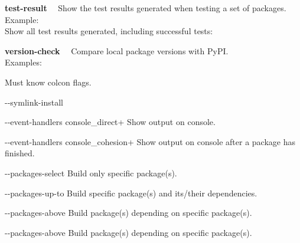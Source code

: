 \documentclass[9pt,a4paper]{article}
\newcommand{\colconcmd}[1]{\textbf{\sffamily\color{blue}#1}~~}
\newcommand{\terminalfont}[1]{{\sffamily#1}}
\newcommand{\terminal}[1]{\-\hspace{0.5cm}\terminalfont{\$ #1}}
\newcommand{\ddash}{-{}-}
\begin{document}
\begin{multicols*}{3}[]
\hrulefill

%
\colconcmd{test-result} Show the test results generated when testing a set of packages.
%
\\
Example:
\\
Show all test results generated, including successful tests:\\
\terminal{colcon test-result --all}
%

\hrulefill

%
\colconcmd{version-check} Compare local package versions with PyPI.
\\
Examples:
\\
\terminal{todo}
%

\hrulefill

Must know colcon flags.

\terminalfont{\ddash symlink-install}

\terminalfont{\ddash event-handlers console\_direct+}
Show output on console.

\terminalfont{\ddash event-handlers console\_cohesion+}
Show output on console after a package has finished.

\terminalfont{\ddash packages-select}
Build only specific package(s).

\terminalfont{\ddash packages-up-to}
Build specific package(s) and its/their dependencies.

\terminalfont{\ddash packages-above}
Build package(s) depending on specific package(s).

\terminalfont{\ddash packages-above}
Build package(s) depending on specific package(s).

\end{multicols*}
\end{document}
